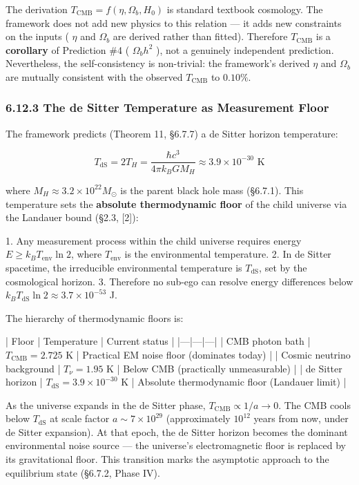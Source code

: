 \documentclass[11pt,a4paper]{article}
\theoremstyle{definition}
\theoremstyle{remark}
\begin{document}
The derivation $T_{\text{CMB}} = f(\eta, \Omega_b, H_0)$ is standard textbook cosmology. The framework does not add new physics to this relation — it adds new constraints on the inputs ( $\eta$ and $\Omega_b$ are derived rather than fitted). Therefore $T_{\text{CMB}}$ is a \textbf{corollary} of Prediction \#4 ( $\Omega_b h^2$ ), not a genuinely independent prediction. Nevertheless, the self-consistency is non-trivial: the framework's derived $\eta$ and $\Omega_b$ are mutually consistent with the observed $T_{\text{CMB}}$ to $0.10\%$.

\subsubsection{6.12.3 The de Sitter Temperature as Measurement Floor}

The framework predicts (Theorem 11, \S 6.7.7) a de Sitter horizon temperature:


\begin{equation}
T_{\text{dS}} = 2T_H = \frac{\hbar c^3}{4\pi k_B G M_H} \approx 3.9 \times 10^{-30} \text{ K}
\end{equation}


where $M_H \approx 3.2 \times 10^{22} M_\odot$ is the parent black hole mass (\S 6.7.1). This temperature sets the \textbf{absolute thermodynamic floor} of the child universe via the Landauer bound (\S 2.3, [2]):

1. Any measurement process within the child universe requires energy $E \geq k_B T_{\text{env}} \ln 2$, where $T_{\text{env}}$ is the environmental temperature.
2. In de Sitter spacetime, the irreducible environmental temperature is $T_{\text{dS}}$, set by the cosmological horizon.
3. Therefore no sub-ego can resolve energy differences below $k_B T_{\text{dS}} \ln 2 \approx 3.7 \times 10^{-53}$ J.

The hierarchy of thermodynamic floors is:

| Floor | Temperature | Current status |
|---|---|---|
| CMB photon bath | $T_{\text{CMB}} = 2.725$ K | Practical EM noise floor (dominates today) |
| Cosmic neutrino background | $T_\nu = 1.95$ K | Below CMB (practically unmeasurable) |
| de Sitter horizon | $T_{\text{dS}} = 3.9 \times 10^{-30}$ K | Absolute thermodynamic floor (Landauer limit) |

As the universe expands in the de Sitter phase, $T_{\text{CMB}} \propto 1/a \to 0$. The CMB cools below $T_{\text{dS}}$ at scale factor $a \sim 7 \times 10^{29}$ (approximately $10^{12}$ years from now, under de Sitter expansion). At that epoch, the de Sitter horizon becomes the dominant environmental noise source — the universe's electromagnetic floor is replaced by its gravitational floor. This transition marks the asymptotic approach to the equilibrium state (\S 6.7.2, Phase IV).
\end{document}
